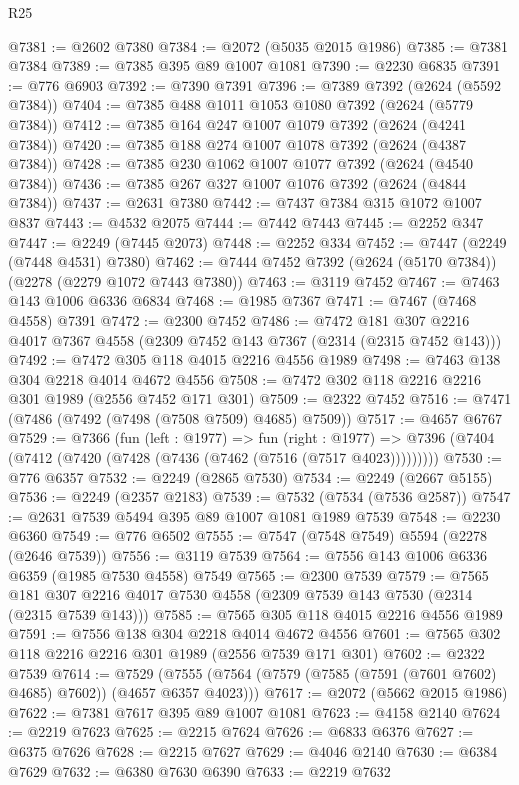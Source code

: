 \begin{lexlean}{R25}
\begin{coremodule}
@7381 := @2602 @7380
@7384 := @2072 (@5035 @2015 @1986)
@7385 := @7381 @7384
@7389 := @7385 @395 @89 @1007 @1081
@7390 := @2230 @6835
@7391 := @776 @6903
@7392 := @7390 @7391
@7396 := @7389 @7392 (@2624 (@5592 @7384))
@7404 := @7385 @488 @1011 @1053 @1080 @7392 (@2624 (@5779 @7384))
@7412 := @7385 @164 @247 @1007 @1079 @7392 (@2624 (@4241 @7384))
@7420 := @7385 @188 @274 @1007 @1078 @7392 (@2624 (@4387 @7384))
@7428 := @7385 @230 @1062 @1007 @1077 @7392 (@2624 (@4540 @7384))
@7436 := @7385 @267 @327 @1007 @1076 @7392 (@2624 (@4844 @7384))
@7437 := @2631 @7380
@7442 := @7437 @7384 @315 @1072 @1007 @837
@7443 := @4532 @2075
@7444 := @7442 @7443
@7445 := @2252 @347
@7447 := @2249 (@7445 @2073)
@7448 := @2252 @334
@7452 := @7447 (@2249 (@7448 @4531) @7380)
@7462 := @7444 @7452 @7392 (@2624 (@5170 @7384)) (@2278 (@2279 @1072 @7443 @7380))
@7463 := @3119 @7452
@7467 := @7463 @143 @1006 @6336 @6834
@7468 := @1985 @7367
@7471 := @7467 (@7468 @4558) @7391
@7472 := @2300 @7452
@7486 := @7472 @181 @307 @2216 @4017 @7367 @4558 (@2309 @7452 @143 @7367 (@2314 (@2315 @7452 @143)))
@7492 := @7472 @305 @118 @4015 @2216 @4556 @1989
@7498 := @7463 @138 @304 @2218 @4014 @4672 @4556
@7508 := @7472 @302 @118 @2216 @2216 @301 @1989 (@2556 @7452 @171 @301)
@7509 := @2322 @7452
@7516 := @7471 (@7486 (@7492 (@7498 (@7508 @7509) @4685) @7509))
@7517 := @4657 @6767
@7529 := @7366
    (fun (left : @1977) =>
    fun (right : @1977) =>
    @7396 (@7404 (@7412 (@7420 (@7428 (@7436 (@7462 (@7516 (@7517 @4023)))))))))
@7530 := @776 @6357
@7532 := @2249 (@2865 @7530)
@7534 := @2249 (@2667 @5155)
@7536 := @2249 (@2357 @2183)
@7539 := @7532 (@7534 (@7536 @2587))
@7547 := @2631 @7539 @5494 @395 @89 @1007 @1081 @1989 @7539
@7548 := @2230 @6360
@7549 := @776 @6502
@7555 := @7547 (@7548 @7549) @5594 (@2278 (@2646 @7539))
@7556 := @3119 @7539
@7564 := @7556 @143 @1006 @6336 @6359 (@1985 @7530 @4558) @7549
@7565 := @2300 @7539
@7579 := @7565 @181 @307 @2216 @4017 @7530 @4558 (@2309 @7539 @143 @7530 (@2314 (@2315 @7539 @143)))
@7585 := @7565 @305 @118 @4015 @2216 @4556 @1989
@7591 := @7556 @138 @304 @2218 @4014 @4672 @4556
@7601 := @7565 @302 @118 @2216 @2216 @301 @1989 (@2556 @7539 @171 @301)
@7602 := @2322 @7539
@7614 := @7529 (@7555 (@7564 (@7579 (@7585 (@7591 (@7601 @7602) @4685) @7602)) (@4657 @6357 @4023)))
@7617 := @2072 (@5662 @2015 @1986)
@7622 := @7381 @7617 @395 @89 @1007 @1081
@7623 := @4158 @2140
@7624 := @2219 @7623
@7625 := @2215 @7624
@7626 := @6833 @6376
@7627 := @6375 @7626
@7628 := @2215 @7627
@7629 := @4046 @2140
@7630 := @6384 @7629
@7632 := @6380 @7630 @6390
@7633 := @2219 @7632

\end{coremodule}
\end{lexlean}
